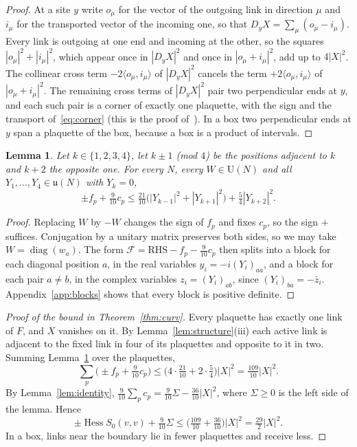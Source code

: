 \documentclass[aps,prd,twocolumn,superscriptaddress,nofootinbib,longbibliography,floatfix,amsmath,amssymb,10pt]{revtex4-2}
\newtheorem{lemma}[theorem]{Lemma}
\theoremstyle{definition}
\theoremstyle{remark}
\newcommand{\U}{\mathrm{U}}
\newcommand{\Hess}{\operatorname{Hess}}
\newcommand{\ip}[2]{\langle #1,#2\rangle}
\begin{document}
\begin{proof}
At a site $y$ write $o_\mu$ for the vector of the outgoing link in direction
$\mu$ and $i_\mu$ for the transported vector of the incoming one, so that
$D_yX=\sum_\mu(o_\mu-i_\mu)$. Every link is outgoing at one end and incoming at
the other, so the squares $|o_\mu|^2+|i_\mu|^2$, which appear once in
$|D_yX|^2$ and once in $|o_\mu+i_\mu|^2$, add up to $4|X|^2$. The collinear
cross term $-2\ip{o_\mu}{i_\mu}$ of $|D_yX|^2$ cancels the term
$+2\ip{o_\mu}{i_\mu}$ of $|o_\mu+i_\mu|^2$. The remaining cross terms of
$|D_yX|^2$ pair two perpendicular ends at $y$, and each such pair is a corner
of exactly one plaquette, with the sign and the transport of~\eqref{eq:corner}
(this is the proof of~\cite[Lemma~1]{BB26a}). In a box two perpendicular ends at $y$ span
a plaquette of the box, because a box is a product of intervals.
\end{proof}

\begin{lemma}\label{lem:local}
Let $k\in\{1,2,3,4\}$, let $k\pm1$ \textup{(}mod $4$\textup{)} be the
positions adjacent to $k$ and $k+2$ the opposite one. For every $N$, every
$W\in\U(N)$ and all $Y_1,\dots,Y_4\in\mathfrak u(N)$ with $Y_k=0$,
\[
\pm f_p+\tfrac9{10}c_p\le\tfrac{21}{10}\bigl(|Y_{k-1}|^2+|Y_{k+1}|^2\bigr)
+\tfrac54|Y_{k+2}|^2 .
\]
\end{lemma}

\begin{proof}
Replacing $W$ by $-W$ changes the sign of $f_p$ and fixes $c_p$, so the sign
$+$ suffices. Conjugation by a unitary matrix preserves both sides, so we may
take $W=\operatorname{diag}(w_a)$. The form $\mathcal F=\mathrm{RHS}-f_p-
\frac9{10}c_p$ then splits into a block for each diagonal position $a$, in the
real variables $y_i=-i(Y_i)_{aa}$, and a block for each pair $a\ne b$, in the
complex variables $z_i=(Y_i)_{ab}$, since $(Y_i)_{ba}=-\bar z_i$. Appendix~\ref{app:blocks}
shows that every block is positive definite.
\end{proof}

\begin{proof}[Proof of the bound in Theorem~\ref{thm:curv}]
Every plaquette has exactly one link of $F$, and $X$ vanishes on it. By
Lemma~\ref{lem:structure}(iii) each active link is adjacent to the fixed
link in four of its plaquettes and opposite to it in two. Summing
Lemma~\ref{lem:local} over the plaquettes,
\[
\sum_p\bigl(\pm f_p+\tfrac9{10}c_p\bigr)\le\bigl(4\cdot\tfrac{21}{10}+2\cdot
\tfrac54\bigr)|X|^2=\tfrac{109}{10}|X|^2 .
\]
By Lemma~\ref{lem:identity}, $\frac9{10}\sum_pc_p=\frac9{10}\Sigma-\frac{36}{10}
|X|^2$, where $\Sigma\ge0$ is the left side of the lemma. Hence
\[
\pm\Hess S_0(v,v)+\tfrac9{10}\Sigma\le\bigl(\tfrac{109}{10}+\tfrac{36}{10}\bigr)
|X|^2=\tfrac{29}2|X|^2 .
\]
In a box, links near the boundary lie in fewer plaquettes and receive less.
\end{proof}
\end{document}
